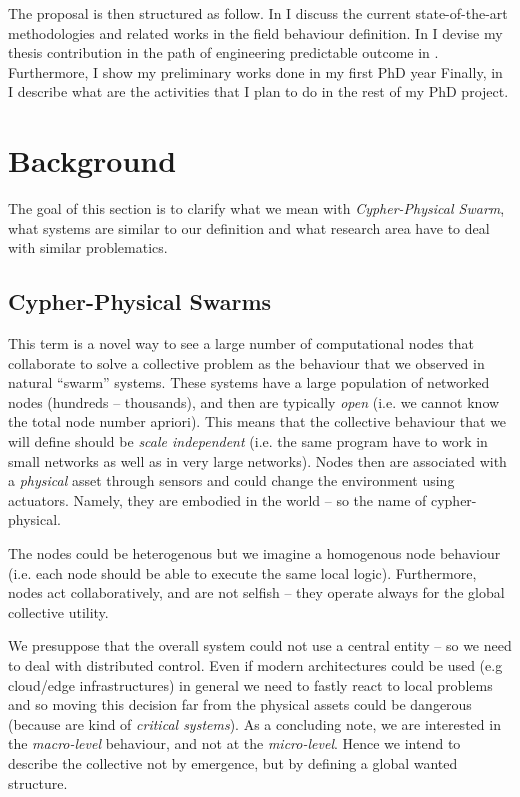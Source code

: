 \documentclass[11pt]{article}
\begin{document}
The proposal is then structured as follow. In  I discuss the current state-of-the-art methodologies and related works in the field \cpsw{} behaviour definition.
%
In  I devise my thesis contribution in the path of engineering predictable outcome in \cpsw{}. Furthermore, I show my preliminary works done in my first PhD year
%
Finally, in  I describe what are the activities that I plan to do in the rest of my PhD project.

\section{Background} \label{background}
The goal of this section is to clarify what we mean with \textit{Cypher-Physical Swarm}, what systems are similar to our definition and what research area have to deal with similar problematics.
\subsection{Cypher-Physical Swarms}
This term is a novel way to see a large number of computational nodes that collaborate to solve a collective problem as the behaviour that we observed in natural ``swarm'' systems.
%
These systems have a large population of networked nodes (hundreds -- thousands), and then are typically \textit{open} (i.e. we cannot know the total node number apriori). This means that the collective behaviour that we will define should be \textit{scale independent} (i.e. the same program have to work in small networks as well as in very large networks).
%
Nodes then are associated with a \textit{physical} asset through sensors and could change the environment using actuators. Namely, they are embodied in the world -- so the name of cypher-physical. 

The nodes could be heterogenous but we imagine a homogenous node behaviour (i.e. each node should be able to execute the same local logic). Furthermore, nodes act collaboratively, and are not selfish -- they operate always for the global collective utility.

We presuppose that the overall system could not use a central entity -- so we need to deal with distributed control. Even if modern architectures could be used (e.g cloud/edge infrastructures) in general we need to fastly react to local problems and so moving this decision far from the physical assets could be dangerous (because are kind of \emph{critical systems}).
%
As a concluding note, we are interested in the \textit{macro-level} behaviour, and not at the \textit{micro-level}. Hence we intend to describe the collective not by emergence, but by defining a global wanted structure.
\end{document}
